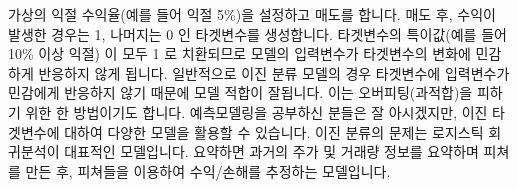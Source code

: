 \documentclass[letterpaper,10pt,english]{jupyterBook}
\begin{document}
\sphinxAtStartPar
가상의 익절 수익율(예를 들어 익절 5\%)을 설정하고 매도를 합니다. 매도 후, 수익이 발생한 경우는 1, 나머지는 0 인 타겟변수를 생성합니다. 타겟변수의 특이값(예를 들어 10\% 이상 익절) 이 모두 1 로 치환되므로 모델의 입력변수가 타겟변수의 변화에 민감하게 반응하지 않게 됩니다. 일반적으로 이진 분류 모델의 경우 타겟변수에 입력변수가 민감에게 반응하지 않기 때문에 모델 적합이 잘됩니다. 이는 오버피팅(과적합)을 피하기 위한 한 방법이기도 합니다. 예측모델링을 공부하신 분들은 잘 아시겠지만, 이진 타겟변수에 대하여 다양한 모델을 활용할 수 있습니다. 이진 분류의 문제는 로지스틱 회귀분석이 대표적인 모델입니다. 요약하면 과거의 주가 및 거래량 정보를 요약하며 피쳐를 만든 후, 피쳐들을 이용하여 수익/손해를 추정하는 모델입니다.







\renewcommand{\indexname}{Index}
\printindex
\end{document}
